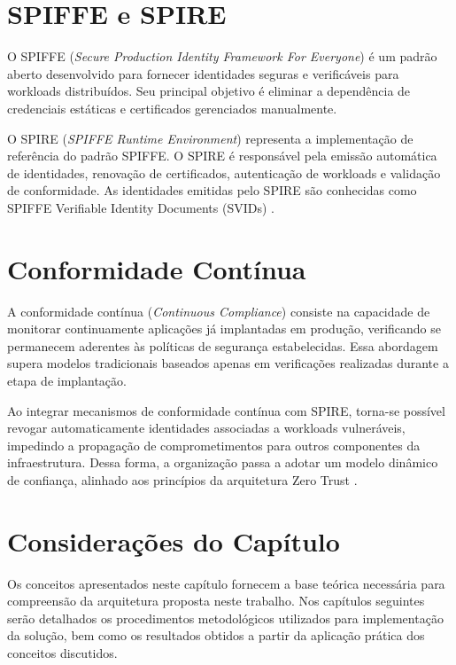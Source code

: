 \section{SPIFFE e SPIRE}
\label{sec:spiffe-spire}

O SPIFFE (\textit{Secure Production Identity Framework For Everyone}) é um padrão aberto desenvolvido para fornecer identidades seguras e verificáveis para workloads distribuídos. Seu principal objetivo é eliminar a dependência de credenciais estáticas e certificados gerenciados manualmente.

O SPIRE (\textit{SPIFFE Runtime Environment}) representa a implementação de referência do padrão SPIFFE. O SPIRE é responsável pela emissão automática de identidades, renovação de certificados, autenticação de workloads e validação de conformidade. As identidades emitidas pelo SPIRE são conhecidas como SPIFFE Verifiable Identity Documents (SVIDs) \cite{gama2024}.

\section{Conformidade Contínua}
\label{sec:continuous-compliance}

A conformidade contínua (\textit{Continuous Compliance}) consiste na capacidade de monitorar continuamente aplicações já implantadas em produção, verificando se permanecem aderentes às políticas de segurança estabelecidas. Essa abordagem supera modelos tradicionais baseados apenas em verificações realizadas durante a etapa de implantação.

Ao integrar mecanismos de conformidade contínua com SPIRE, torna-se possível revogar automaticamente identidades associadas a workloads vulneráveis, impedindo a propagação de comprometimentos para outros componentes da infraestrutura. Dessa forma, a organização passa a adotar um modelo dinâmico de confiança, alinhado aos princípios da arquitetura Zero Trust \cite{gama2024}.

\section{Considerações do Capítulo}
\label{sec:consideracoes-fundamentacao}

Os conceitos apresentados neste capítulo fornecem a base teórica necessária para compreensão da arquitetura proposta neste trabalho. Nos capítulos seguintes serão detalhados os procedimentos metodológicos utilizados para implementação da solução, bem como os resultados obtidos a partir da aplicação prática dos conceitos discutidos.
